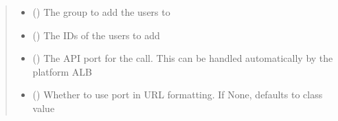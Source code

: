 \documentclass[letterpaper,10pt,english]{sphinxmanual}
\begin{document}
\begin{fulllineitems}
\begin{fulllineitems}
\begin{sphinxVerbatim}[commandchars=\\\{\}]
 
  
 \PYG{p}{[} \PYG{p}{]}
\end{sphinxVerbatim}
\begin{quote}\begin{description}
\begin{itemize}
\item {} 
\sphinxAtStartPar
{} () \textendash{} The group to add the users to

\item {} 
\sphinxAtStartPar
{} () \textendash{} The IDs of the users to add

\item {} 
\sphinxAtStartPar
{} (\sphinxstyleliteralemphasis{\sphinxupquote{ (}}\sphinxstyleliteralemphasis{\sphinxupquote{)}}) \textendash{} The API port for the call. This can be handled automatically by the platform ALB

\item {} 
\sphinxAtStartPar
{} (\sphinxstyleliteralemphasis{\sphinxupquote{ (}}\sphinxstyleliteralemphasis{\sphinxupquote{)}}) \textendash{} Whether to use port in URL formatting. If None, defaults to class value


\end{itemize}
\end{description}
\end{quote}
\end{fulllineitems}
\end{fulllineitems}
\end{document}
